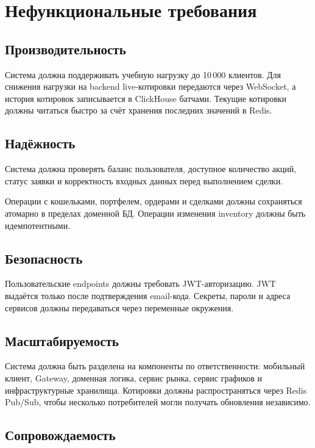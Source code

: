 \documentclass[12pt,a4paper]{article}
\begin{document}
\section{Нефункциональные требования}

\subsection{Производительность}

Система должна поддерживать учебную нагрузку до 10\,000 клиентов. Для снижения
нагрузки на backend live-котировки передаются через WebSocket, а история котировок
записывается в ClickHouse батчами. Текущие котировки должны читаться быстро за
счёт хранения последних значений в Redis.

\subsection{Надёжность}

Система должна проверять баланс пользователя, доступное количество акций, статус
заявки и корректность входных данных перед выполнением сделки.

Операции с кошельками, портфелем, ордерами и сделками должны сохраняться атомарно
в пределах доменной БД. Операции изменения inventory должны быть идемпотентными.

\subsection{Безопасность}

Пользовательские endpoints должны требовать JWT-авторизацию. JWT выдаётся только
после подтверждения email-кода. Секреты, пароли и адреса сервисов должны
передаваться через переменные окружения.

\subsection{Масштабируемость}

Система должна быть разделена на компоненты по ответственности: мобильный клиент,
Gateway, доменная логика, сервис рынка, сервис графиков и инфраструктурные
хранилища. Котировки должны распространяться через Redis Pub/Sub, чтобы несколько
потребителей могли получать обновления независимо.

\subsection{Сопровождаемость}
\end{document}

